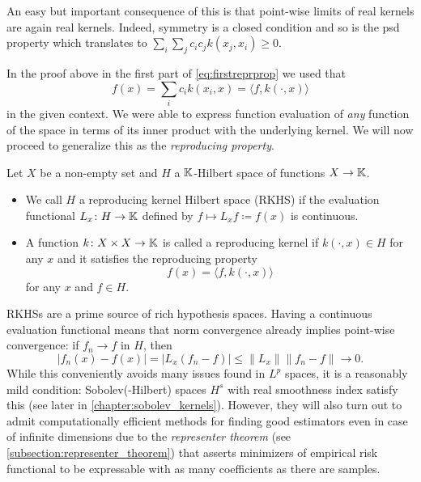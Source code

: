 An easy but important consequence of this is that point-wise limits
of real kernels are again real kernels.
Indeed, symmetry is a closed condition and so is the psd property 
which translates to 
$\sum_i \sum_j c_i c_j k(x_j,x_i) \geq 0$.

In the proof above in the first part of \cref{eq:firstreprprop}
we used that 
\begin{equation*}
    f(x) = \sum_i c_i k(x_i,x) = \langle f, k(\cdot,x) \rangle
\end{equation*}
in the given context.
We were able to express function evaluation of \emph{any} 
function of the space in terms of its inner product with 
the underlying kernel.
We will now proceed to generalize this as the 
\emph{reproducing property}.

\begin{defn}
    Let $X$ be a non-empty set and $H$ a $\mathbb{K}$-Hilbert space
    of functions $X \to \mathbb{K}$.
    \begin{itemize}
        \item We call $H$ a reproducing kernel Hilbert space
            (RKHS) if the evaluation functional $L_x \colon H \to \mathbb{K}$ 
            defined by $f \mapsto L_xf \coloneqq f(x)$ is continuous.  
        \item A function $k \colon X \times X \to \mathbb{K}$ is called 
            a reproducing kernel if $k(\cdot,x) \in H$ for any 
            $x$ and it satisfies the reproducing property
            \begin{equation}\label{eq:reprprop}
                f(x) = \langle f,k(\cdot,x) \rangle
            \end{equation}
            for any $x$ and $f \in H$.
    \end{itemize}
\end{defn}

RKHSs are a prime source of rich hypothesis spaces.
Having a continuous evaluation functional means that norm 
convergence already implies point-wise convergence:
if $f_n \to f$ in $H$, then 
\begin{equation}\label{eq:normconv_pwconv}
    |f_n(x) - f(x)| = |L_x(f_n - f)| 
        \leq \|L_x\| \|f_n - f\| \to 0.
\end{equation}
While this conveniently avoids many issues found 
in $L^p$ spaces, it is a reasonably mild condition:
Sobolev(-Hilbert) spaces $H^s$ with real smoothness index
satisfy this (see later in \cref{chapter:sobolev_kernels}).
However, they will also turn out to admit computationally 
efficient methods for finding good estimators even in 
case of infinite dimensions due to the 
\emph{representer theorem} 
(see \cref{subsection:representer_theorem}) 
that asserts minimizers of empirical risk functional
to be expressable with as many coefficients as there are
samples.

